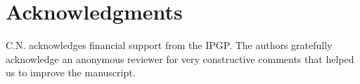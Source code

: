 \documentclass[11pt]{article}
\begin{document}
    
	\section{Acknowledgments}
	
	C.N. acknowledges financial support from the IPGP. The authors gratefully acknowledge an anonymous reviewer for very constructive comments that helped us to improve the manuscript.
	
	
	
	\footnotesize
	
	
	
	
\end{document}

